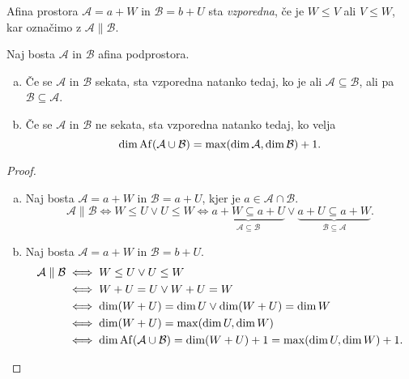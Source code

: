 \begin{definicija}
    Afina prostora $\mathcal{A} = a + W$ in $\mathcal{B} = b + U$ sta \emph{vzporedna}, če je $W \leq V$ ali $V \leq W$, kar označimo z $\mathcal{A} \parallel \mathcal{B}$. 
\end{definicija}

\begin{trditev}
    Naj bosta $\mathcal{A}$ in $\mathcal{B}$ afina podprostora. 

	\begin{enumerate}[a)]
	\item Če se $\mathcal{A}$ in $\mathcal{B}$ sekata, sta vzporedna natanko tedaj, ko je ali $\mathcal{A} \subseteq \mathcal{B}$, ali pa $\mathcal{B} \subseteq \mathcal{A}$.

    \item Če se $\mathcal{A}$ in $\mathcal{B}$ ne sekata, sta vzporedna natanko tedaj, ko velja 
    \[
        \dim \operatorname{Af} (\mathcal{A} \cup \mathcal{B}) = \max (\dim \mathcal{A}, \dim \mathcal{B}) + 1.
    \]
    \end{enumerate}
\end{trditev}

\begin{proof}
    \begin{enumerate}[a)]
	\item Naj bosta $\mathcal{A} = a + W$ in $\mathcal{B} = a + U$, kjer je $a \in \mathcal{A} \cap \mathcal{B}$.
    \[
    \mathcal{A} \parallel \mathcal{B} \iff W \leq U \lor U \leq W \iff \underbrace{a + W \subseteq a + U}_{\mathcal{A} \subseteq \mathcal{B}} \lor \underbrace{a + U \subseteq a + W}_{\mathcal{B} \subseteq \mathcal{A}}.
    \]

    \item Naj bosta $\mathcal{A} = a + W$ in $\mathcal{B} = b + U$.
    \begin{align*}
        \mathcal{A} \parallel \mathcal{B} &\iff W \leq U \lor U \leq W \\
        &\iff W + U = U \lor W + U = W \\
        &\iff \dim (W + U) = \dim U \lor \dim (W + U) = \dim W \\
        &\iff \dim (W + U) = \max (\dim U, \dim W) \\
        &\iff \dim \operatorname{Af} (\mathcal{A} \cup \mathcal{B}) = \dim (W + U) + 1 = \max (\dim U, \dim W) + 1. \qedhere
    \end{align*}
    \end{enumerate}
\end{proof}

